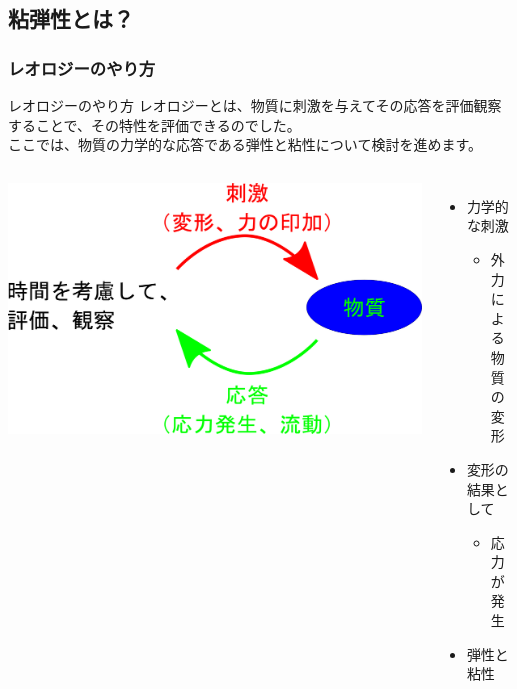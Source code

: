 \documentclass[12pt, dvipdfmx]{beamer}
\begin{document}
\subsection{粘弾性とは？}
\begin{frame}
	\frametitle{レオロジーのやり方}
	\begin{block}{レオロジーのやり方}
		レオロジーとは、物質に刺激を与えてその応答を評価観察することで、その特性を評価できるのでした。\\
		ここでは、物質の力学的な応答である弾性と粘性について検討を進めます。
	\end{block}
	\begin{columns}[T, onlytextwidth]
			\includegraphics[width=\textwidth]{Rheo_method.png}
			\begin{itemize}
				\item 力学的な刺激
				\begin{itemize}
					\item 外力による\\物質の変形
				\end{itemize}
				\item 変形の結果として
				\begin{itemize}
					\item 応力が発生
				\end{itemize}
				\item 弾性と粘性
			\end{itemize}
	\end{columns}
\end{frame}
\end{document}
